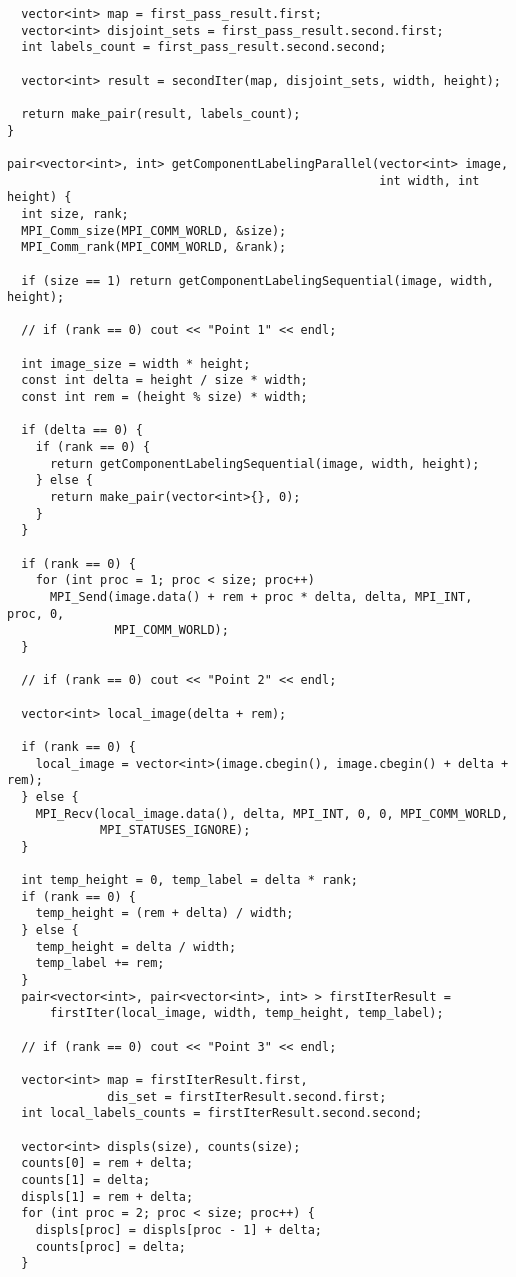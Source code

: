 \documentclass{report}
\begin{document}
\begin{lstlisting}
  vector<int> map = first_pass_result.first;
  vector<int> disjoint_sets = first_pass_result.second.first;
  int labels_count = first_pass_result.second.second;

  vector<int> result = secondIter(map, disjoint_sets, width, height);

  return make_pair(result, labels_count);
}

pair<vector<int>, int> getComponentLabelingParallel(vector<int> image,
                                                    int width, int height) {
  int size, rank;
  MPI_Comm_size(MPI_COMM_WORLD, &size);
  MPI_Comm_rank(MPI_COMM_WORLD, &rank);

  if (size == 1) return getComponentLabelingSequential(image, width, height);

  // if (rank == 0) cout << "Point 1" << endl;

  int image_size = width * height;
  const int delta = height / size * width;
  const int rem = (height % size) * width;

  if (delta == 0) {
    if (rank == 0) {
      return getComponentLabelingSequential(image, width, height);
    } else {
      return make_pair(vector<int>{}, 0);
    }
  }

  if (rank == 0) {
    for (int proc = 1; proc < size; proc++)
      MPI_Send(image.data() + rem + proc * delta, delta, MPI_INT, proc, 0,
               MPI_COMM_WORLD);
  }

  // if (rank == 0) cout << "Point 2" << endl;

  vector<int> local_image(delta + rem);

  if (rank == 0) {
    local_image = vector<int>(image.cbegin(), image.cbegin() + delta + rem);
  } else {
    MPI_Recv(local_image.data(), delta, MPI_INT, 0, 0, MPI_COMM_WORLD,
             MPI_STATUSES_IGNORE);
  }

  int temp_height = 0, temp_label = delta * rank;
  if (rank == 0) {
    temp_height = (rem + delta) / width;
  } else {
    temp_height = delta / width;
    temp_label += rem;
  }
  pair<vector<int>, pair<vector<int>, int> > firstIterResult =
      firstIter(local_image, width, temp_height, temp_label);

  // if (rank == 0) cout << "Point 3" << endl;

  vector<int> map = firstIterResult.first,
              dis_set = firstIterResult.second.first;
  int local_labels_counts = firstIterResult.second.second;

  vector<int> displs(size), counts(size);
  counts[0] = rem + delta;
  counts[1] = delta;
  displs[1] = rem + delta;
  for (int proc = 2; proc < size; proc++) {
    displs[proc] = displs[proc - 1] + delta;
    counts[proc] = delta;
  }


\end{lstlisting}
\end{document}
